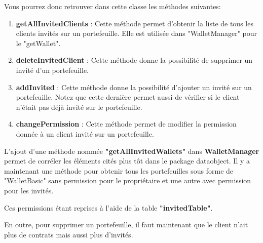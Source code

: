 \begin{enumerate}
Vous pourrez donc retrouver dans cette classe les méthodes suivantes:
\begin{enumerate}
\item \textbf{getAllInvitedClients} :\newline
Cette méthode permet d'obtenir la liste de tous les clients invités sur un portefeuille.\newline
Elle est utilisée dans "WalletManager" pour le "getWallet".
\item \textbf{deleteInvitedClient} :\newline
Cette méthode donne la possibilité de supprimer un invité d'un portefeuille.
\item \textbf{addInvited} :\newline
Cette méthode donne la possibilité d'ajouter un invité sur un portefeuille.\newline
Notez que cette dernière permet aussi de vérifier si le client n'était pas déjà invité sur le portefeuille.
\item \textbf{changePermission} :\newline
Cette méthode permet de modifier la permission donnée à un client invité sur un portefeuille.

\end{enumerate}

\end{enumerate}

\begin{flushleft}
L'ajout d'une méthode nommée \textbf{"getAllInvitedWallets"} dans \textbf{WalletManager} permet de corréler les éléments cités plus tôt dans le package dataobject.
Il y a maintenant une méthode pour obtenir tous les portefeuilles sous forme de "WalletBasic" sans permission pour le propriétaire et une autre avec permission pour les invités.
\end{flushleft}

\begin{flushleft}
Ces permissions étant reprises à l'aide de la table \textbf{"invitedTable"}.
\end{flushleft}

\begin{flushleft}
En outre, pour supprimer un portefeuille, il faut maintenant que le client n'ait plus de contrats mais aussi plus d'invités.
\end{flushleft}